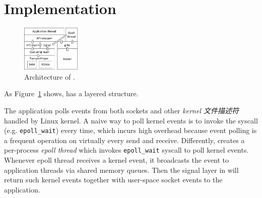 \section{Implementation}
\label{socksdirect:sec:implementation}

\begin{figure}[htbp]
	\centering
	\includegraphics[width=0.25\textwidth]{images/libsd_architecture}
	
	\caption{Architecture of \libipc{}.}
	\label{socksdirect:fig:libsd-architecture}
\end{figure}



As Figure~\ref{socksdirect:fig:libsd-architecture} shows, \libipc{} has a layered structure.








The application polls events from both sockets and other \textit{kernel 文件描述符} handled by Linux kernel.
A naive way to poll kernel events is to invoke the syscall (e.g. \texttt{epoll\_wait}) every time, which incurs high overhead because event polling is a frequent operation on virtually every send and receive.
Differently, \libipc{} creates a per-process \textit{epoll thread} which invokes \texttt{epoll\_wait} syscall to poll kernel events. Whenever epoll thread receives a kernel event, it broadcasts the event to application threads via shared memory queues. Then the signal layer in \libipc{} will return such kernel events together with user-space socket events to the application.

